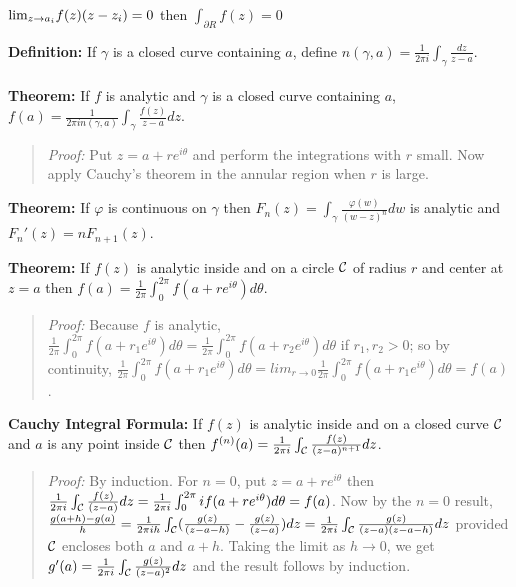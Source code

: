 $\textnormal{lim}_{z \rightarrow a_i} f(z)(z-z_i)= 0$ then $\int_{\partial R} f(z) = 0$
\begin{quote}
\end{quote}
{\bf Definition:} 
If $\gamma$ is a closed curve containing $a$, define  $n(\gamma, a)= {\frac 1 {2 \pi i}} 
\int_{\gamma} {\frac {dz}{z-a}}$. 
\\
\\
{\bf Theorem:}  
If $f$ is analytic 
and $\gamma$ is a closed curve containing $a$, $f(a)= {\frac 1 {2 \pi i n(\gamma, a)}} \int_{\gamma}
{\frac {f(z)} {z-a}} dz$.
\begin{quote}
\emph{Proof:} Put $z = a + re^{i \theta}$ and perform the integrations with $r$ small.
Now apply Cauchy's theorem in the annular region when $r$ is large.
\end{quote}
{\bf Theorem:}  
If $\varphi$ is continuous on $\gamma$ then $F_n(z)=
\int_{\gamma} {\frac {\varphi(w)} {(w-z)^n}} dw$ is analytic and $F_n'(z)= n F_{n+1}(z)$.
\begin{quote}
\end{quote}
{\bf Theorem:}
If $f(z)$ is analytic inside and on a circle ${\cal C}$ of
radius $r$ and center at $z=a$ then $f(a)= {\frac 1 {2 \pi}} \int_0^{2 \pi} 
f(a+ r e^{i \theta}) d \theta$.
\begin{quote}
\emph{Proof:}
Because $f$ is analytic,
$ {\frac 1 {2 \pi}} \int_0^{2 \pi} f(a+r_1 e^{i \theta}) d \theta
= {\frac 1 {2 \pi}} \int_0^{2 \pi} f(a+r_2 e^{i \theta}) d \theta$
if $r_1, r_2>0$; so by continuity,
$ {\frac 1 {2 \pi}} \int_0^{2 \pi} f(a+r_1 e^{i \theta}) d \theta=
lim_{r \rightarrow 0} {\frac 1 {2 \pi}} \int_0^{2 \pi} f(a+r_1 e^{i \theta}) d \theta =
f(a) $.
\end{quote}
{\bf Cauchy Integral Formula:}
If $f(z)$ is analytic inside and on a closed curve ${\cal C}$ and $a$ is any
point inside ${\cal C}$ 
then  $f^{(n)}(a)= {\frac 1 {2 \pi i}} \int_{\cal C} {\frac {f(z)} {(z-a)^{n+1}}} dz$.
\begin{quote}
\emph{Proof:}
By induction.  For $n=0$, put $z= a+r e^{i \theta}$ then
${\frac 1 {2 \pi i}} \int_{\cal C} {\frac {f(z)} {(z-a)}} dz=
{\frac 1 {2 \pi i}} \int_{0}^{2\pi} i f(a+re^{i \theta}) d \theta = f(a)$.  Now
by the $n=0$ result, ${\frac {g(a+h)-g(a)} {h}}= 
{\frac 1 {2 \pi i h}} \int_{\cal C}
({\frac {g(z)} {(z-a-h)}}- {\frac {g(z)} {(z-a)}}) dz= 
{\frac 1 {2 \pi i}} \int_{\cal C} {\frac {g(z)} {(z-a)(z-a-h)}} dz$ provided ${\cal C}$
encloses both $a$ and $a+h$.  Taking the limit as $h \rightarrow 0$, we get
$g'(a)= {\frac 1 {2 \pi i}} \int_{\cal C} {\frac {g(z)} {(z-a)^2}} dz$ 
and the result follows by induction.
\end{quote}
